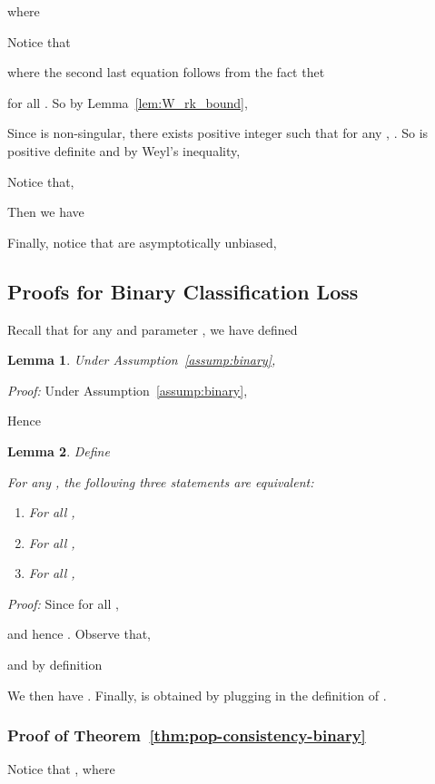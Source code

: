 \documentclass[11pt,a4paper]{article}
\newtheorem{lemma}{Lemma}[section]
\begin{document}
where 

Notice that 


where the second last equation follows from the fact thet 

for all . So by Lemma~\ref{lem:W_rk_bound}, 

Since  is non-singular, there exists positive integer  such that for any , . So  is positive definite and by Weyl's inequality, 

Notice that,

Then we have 

Finally, notice that  are asymptotically unbiased, 




\subsection{Proofs for Binary Classification Loss}
\label{sec:proof-binary}


Recall that for any  and parameter , we have defined 


\begin{lemma}
Under Assumption~\ref{assump:binary}, 

\label{lemma:g}
\end{lemma}

{\em Proof:} Under Assumption~\ref{assump:binary}, 

Hence



\begin{lemma}
Define 

For any , the following three statements are equivalent: 
\begin{enumerate}[label={(\arabic*)}]
  \item  For all ,
  
  \item  For all ,
  
  \item  For all ,
  
\end{enumerate}
\label{lem:iden-binary}
\end{lemma}


{\em Proof:} 
Since  for all ,  

and hence . Observe that,  

and by definition

We then have . Finally,  is obtained by plugging in the definition of .



\subsubsection{Proof of Theorem~\ref{thm:pop-consistency-binary}}
\label{sec:pf-pop-consis-binary}
Notice that , where
\end{document}
